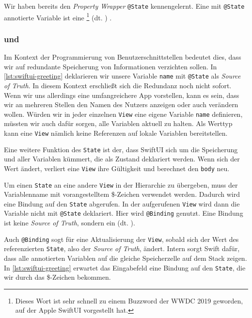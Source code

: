 Wir haben bereits den \emph{Property Wrapper} \texttt{@State} kennengelernt. Eine mit \texttt{@State} annotierte Variable ist eine \footnote{Dieses Wort ist sehr schnell zu einem Buzzword der WWDC 2019 geworden, auf der Apple SwiftUI vorgestellt hat.} (dt. ) \cite{Apple::SwiftUI-Documentation}.

\subsubsection{ und }

Im Kontext der Programmierung von Benutzerschnittstellen bedeutet dies, dass wir auf redundante Speicherung von Informationen verzichten sollen. In \autoref{lst:swiftui-greeting} deklarieren wir unsere Variable \texttt{name} mit \texttt{@State} als \emph{Source of Truth}. In diesem Kontext erschließt sich die Redundanz noch nicht sofort. Wenn wir uns allerdings eine umfangreichere App vorstellen, kann es sein, dass wir an mehreren Stellen den Namen des Nutzers anzeigen oder auch verändern wollen. Würden wir in jeder einzelnen \texttt{View} eine eigene Variable \texttt{name} definieren, müssten wir auch dafür sorgen, alle Variablen aktuell zu halten. Als Werttyp kann eine \texttt{View} nämlich keine Referenzen auf lokale Variablen bereitstellen.

Eine weitere Funktion des \texttt{State} ist der, dass SwiftUI sich um die Speicherung und  aller Variablen kümmert, die als Zustand deklariert werden. Wenn sich der Wert ändert, verliert eine \texttt{View} ihre Gültigkeit und berechnet den \texttt{body} neu.

Um einen \texttt{State} an eine andere \texttt{View} in der Hierarchie zu übergeben, muss der Variablenname mit vorangestelltem \$-Zeichen verwendet werden. Dadurch wird eine Bindung auf den \texttt{State} abgerufen. In der aufgerufenen \texttt{View} wird dann die Variable nicht mit \texttt{@State} deklariert. Hier wird \texttt{@Binding} genutzt. Eine Bindung ist keine \emph{Source of Truth}, sondern ein  (dt. ).

Auch \texttt{@Binding} sogt für eine Aktualisierung der \texttt{View}, sobald sich der Wert des referenzierten \texttt{State}, also der \emph{Source of Truth}, ändert. Intern sorgt Swift dafür, dass alle annotierten Variablen auf die gleiche Speicherzelle auf dem Stack zeigen. In \autoref{lst:swiftui-greeting} erwartet das Eingabefeld eine Bindung auf den \texttt{State}, die wir durch das \$-Zeichen bekommen.

